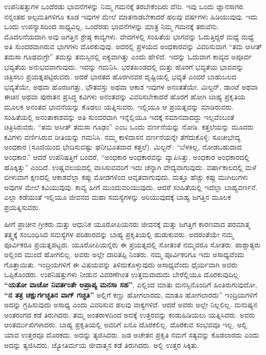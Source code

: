 ಉಪನಿಷತ್ತುಗಳ ಒಂದೆರಡು ಭಾವನೆಗಳನ್ನು ನಿಮ್ಮ ಗಮನಕ್ಕೆ ತರಬೇಕೆಂದಿರು ವೆನು. ಇವು ಒಂದು ಜ್ಞಾನಸಾಗರ. ನನ್ನಂತಹ ಅಲ್ಪಮತಿಗಳಿಗೂ ಕೂಡ ಇವುಗಳ ಮೇಲೆ ಮಾತನಾಡಬೇಕಾದರೆ ಹಲವು ವರ್ಷಗಳು ಹಿಡಿಯುವುವು. ಇದು ಒಂದು ಉಪನ್ಯಾಸದಿಂದ ಸಾಧ್ಯವಿಲ್ಲ. ಒಂದೆರಡು ಭಾವನೆಗಳನ್ನು ಮಾತ್ರ ನಿಮ್ಮ ಗಮನಕ್ಕೆ ತರುವೆನು. ಮೊದಲನೆಯದಾಗಿ ಅವು ಜಗತ್ತಿನ ಶ್ರೇಷ್ಠ ಕಾವ್ಯಗಳು. ವೇದಗಳಲ್ಲಿ ಸಂಹಿತೆಯ ಭಾಗವನ್ನು ಓದುತ್ತಿದ್ದರೆ ಮಧ್ಯೆ ಮಧ್ಯೆ ಅತಿ ಸುಂದರವಾಗಿರುವ ಭಾಗಗಳು ದೊರಕುವುವು. ಅದರಲ್ಲಿ ಪ್ರಳಯದ ಅಂಧಕಾರವನ್ನು ವಿವರಿಸುವಾಗ “ತಮ ಆಸೀತ್​ ತಮಸಾ ಗೂಢಮಗ್ರೇ” ತಮಸ್ಸು ತಮಸ್ಸಿನಲ್ಲಿ ಐಕ್ಯವಾಗಿತ್ತು ಎಂದು ಹೇಳಿದೆ. ಇದನ್ನು ಓದುವಾಗ ಕಾವ್ಯದ ಅಪೂರ್ವ ಭವ್ಯತೆಯ ಅನುಭವವಾಗುವುದು. ಇದನ್ನು ಗಮನಿಸಿ. ಭರತಖಂಡದಲ್ಲಿ ಮತ್ತು ಹೊರಗೆ ಭವ್ಯತೆಯ ಭಾವವನ್ನು ಚಿತ್ರಿಸಲು ಪ್ರಯತ್ನಪಟ್ಟಿರುವರು. ಆದರೆ ಭಾರತದ ಹೊರಗಿನವರ ದೃಷ್ಟಿಯಲ್ಲಿ ಭವ್ಯತೆ ಎಂದರೆ ಬಾಹುಬಲದ ಭವ್ಯತೆಯೇ, ಅಥವಾ ಹೊರಜಗತ್ತು, ಭೌತವಸ್ತು ಅಥವಾ ಆಕಾಶ ಇವುಗಳ ಅನಂತತೆಯೇ. ಮಿಲ್ಟನ್​, ಡಾಂಟೆ ಅಥವಾ ಈಚಿನ ಅಥವಾ ಪುರಾತನ ಪ್ರಸಿದ್ಧ ಕವಿಗಳು ಅನಂತವನ್ನು ವಿವರಿಸಬೇಕಾದರೆ ಹೊರಗೆ ಹೋಗಿ ಬಾಹ್ಯ ಪ್ರಕೃತಿಯ ಮೂಲಕ ಅನಂತದ ಭಾವನೆಯನ್ನು ಕೊಡಲು ಯತ್ನಿಸುವರು. ಇಲ್ಲಿಯೂ ಆ ಪ್ರಯತ್ನವನ್ನು ಮಾಡಿರುವರು. ಸಂಹಿತೆಯಲ್ಲಿ ಅನಂತಾಕಾಶವನ್ನು ಅತಿ ಸುಂದರವಾಗಿ ಇನ್ನೆಲ್ಲಿಯೂ ಇದಕ್ಕೆ ಸಮಾನವಾದದ್ದು ಇಲ್ಲವೆಂಬಂತೆ ಚಿತ್ರಿಸಿರುವರು. “ತಮ ಆಸೀತ್​ ತಮಸಾ ಗೂಢಂ” ಎಂಬ ಒಂದು ವರ್ಣನೆಯನ್ನು ನೋಡಿ. ಕತ್ತಲೆಯನ್ನು ಮೂವರು ಕವಿಗಳು ವರ್ಣಿಸಿರುವ ರೀತಿಯನ್ನು ಗಮನಿಸಿ. ನಮ್ಮ ಕಾಳಿದಾಸನ ವರ್ಣನೆಯನ್ನೇ ತೆಗೆದುಕೊಳ್ಳಿ: ಸೂಚೀಭೇದ್ಯ ಅಂಧಕಾರ (ಸೂಜಿಯಿಂದ ಭೇದಿಸುವಷ್ಟು ಘನೀಭೂತವಾದ ಕತ್ತಲೆ). ಮಿಲ್ಟನ್​: “ಬೆಳಕಿಲ್ಲ, ನೋಡಬಹುದಾದ ಅಂಧಕಾರ.” ಆದರೆ ಉಪನಿಷತ್ತಿಗೆ ಬಂದರೆ, “ಅಂಧಕಾರ ಅಂಧಕಾರವನ್ನು ವ್ಯಾಪಿಸಿತ್ತು. ಅಂಧಕಾರ ಅಂಧಕಾರದಲ್ಲಿ ಹೊಕ್ಕಿತ್ತು” ಎಂದಿದೆ. ಉಷ್ಣವಲಯದಲ್ಲಿ ವಾಸಿಸುವವರಿಗೆ ಇದು ಚೆನ್ನಾಗಿ ವೇದ್ಯವಾಗುವುದು. ವರ್ಷಾಕಾಲದಲ್ಲಿ ಮಳೆ ಬೀಳುವಾಗ ಕ್ಷಣದಲ್ಲಿ ಆಕಾಶವೆಲ್ಲಾ ಕಪ್ಪು ಮೋಡಗಳಿಂದ ಆವೃತವಾಗುವುದು, ಮತ್ತೂ ಹೆಚ್ಚು ಕಪ್ಪು ಮುಗಿಲುಗಳು ಅವುಗಳ ಮೇಲೆ ಕವಿಯುವುವು. ಕಾವ್ಯ ಹೀಗೆ ಮುಂದುವರಿಯುವುದು. ಆದರೆ ಸಂಹಿತೆಯಲ್ಲಿ ಇದೆಲ್ಲಾ ಬಾಹ್ಯವರ್ಣನೆ. ಎಲ್ಲಾ ಕಡೆಯಂತೆ ಇಲ್ಲಿಯೂ ಜೀವನದ ಮಹಾ ಸಮಸ್ಯೆಗಳನ್ನು ಅರಿಯುವುದಕ್ಕೆ ಬಾಹ್ಯ ಜಗತ್ತಿನ ಮೂಲಕ ಪ್ರಯತ್ನಿಸುವರು.

ಹೀಗೆ ಪ್ರಾಚೀನ ಗ್ರೀಕರು ಮತ್ತು ಆಧುನಿಕ ಯೂರೋಪಿಯನರು ಜೀವನಕ್ಕೆ ಮತ್ತು ಜಗತ್ತಿಗೆ ಕಾರಣವಾದ ಪರಮಾತ್ಮ ತತ್ತ್ವಕ್ಕೆ ಸಂಬಂಧಿಸಿದ ಸಮಸ್ಯೆಗಳ ಪರಿಹಾರವನ್ನು ಬಾಹ್ಯ ಪ್ರಕೃತಿಯಲ್ಲಿ ಹುಡುಕುವರು. ಅದರಂತೆಯೇ ನಮ್ಮ ಪೂರ್ವಿಕರೂ ಪ್ರಯತ್ನಪಟ್ಟರು. ಯೂರೋಪಿಯನ್ನರು ಈ ಪ್ರಯತ್ನದಲ್ಲಿ ಸೋತಂತೆ ನಮ್ಮವರೂ ಸೋತರು. ಪಾಶ್ಚಾತ್ಯರು ಅಲ್ಲಿಂದ ಮುಂದೆ ಹೋಗಲಿಲ್ಲ. ಅವರು ಅಲ್ಲೇ ದಾರಿತಪ್ಪಿ ನಿಂತರು. ನಮ್ಮ ಪೂರ್ವಿಕರಿಗೂ ಇದು ಅಸಾಧ್ಯವೆಂದು ಗೊತ್ತಾಯಿತು. ಇಂದ್ರಿಯಗಳಿಗೆ ಈ ವಿಷಯವನ್ನು ತಿಳಿದುಕೊಳ್ಳುವುದು ಅಸಾಧ್ಯವೆಂದು ಧೈರ್ಯವಾಗಿ ಅವರು ಒಪ್ಪಿಕೊಂಡರು. ಉಪನಿಷತ್ತುಗಳು ನೀಡುವ ವಿವರಣೆಗಿಂತ ಉತ್ತಮವಾದುದು ಬೇರೆಲ್ಲಿಯೂ ದೊರಕುವುದಿಲ್ಲ. \textbf{“ಯತೋ ವಾಚೋ ನಿವರ್ತಂತೇ ಅಪ್ರಾಪ್ಯ ಮನಸಾ ಸಹ”}, ಎಲ್ಲಿಂದ ಮಾತು ಮನಸ್ಸಿನೊಂದಿಗೆ ಹಿಂತಿರುಗುವುದೋ, \textbf{“ನ ತತ್ರ ಚಕ್ಷುರ್ಗಚ್ಛತಿನ ವಾಗ್​ ಗಚ್ಛತಿ”} ಅಲ್ಲಿಗೆ ಕಣ್ಣು ಹೋಗಲಾರದು, ಮಾತೂ ಹೋಗಲಾರದು” ಇಂದ್ರಿಯಗಳಿಗೆ ಅದನ್ನು ಗ್ರಹಿಸುವುದು ಅಸಾಧ್ಯ ಎಂದು ವಿವರಿಸುವ ಹಲವು ವಾಕ್ಯಗಳಿವೆ. ಆದರೆ ಅವರು ಅಲ್ಲೇ ನಿಲ್ಲಲಿಲ್ಲ. ಮನುಷ್ಯನ ಅಂತರಂಗದ ಕಡೆ ತಿರುಗಿದರು. ತಮ್ಮ ಅಂತರಾಳದಿಂದ ಅದಕ್ಕೆ ಉತ್ತರವನ್ನು ಕಂಡುಹಿಡಿಯಲು ಯತ್ನಿಸಿದರು. ಅವರು ಆಂತರ್ಮುಖಿಗಳಾದರು. ಬಾಹ್ಯ ಪ್ರಕೃತಿಯಲ್ಲಿ ಅವರಿಗೆ ಏನೂ ದೊರಕಲಿಲ್ಲ. ದೊರಕುವ ಸಂಭವವೂ ಇಲ್ಲ. ಅಲ್ಲಿ ಯಾವ ಉತ್ತರವೂ ದೊರಕದು. ಅದನ್ನು ತ್ಯಜಿಸಿದರು. ಜಡ ಅಚೇತನ ಪ್ರಕೃತಿ ನಮಗೆ ಸತ್ಯವನ್ನು ಕೊಡಲಾರದು ಎಂದು ಅದನ್ನು ತ್ಯಜಿಸಿದರು. ಜ್ಯೋತಿರ್ಮಯ ಜೀವಾತ್ಮನ ಕಡೆ ತಿರುಗಿದರು. ಅಲ್ಲಿ ಉತ್ತರ ಸಿಕ್ಕಿತು.


